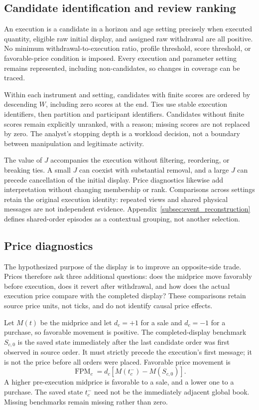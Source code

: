 \subsection{Candidate identification and review ranking}
\label{subsec:candidature_priority}
An execution is a candidate in a horizon and age setting precisely when executed quantity, eligible raw initial display, and assigned raw withdrawal are all positive. No minimum withdrawal-to-execution ratio, profile threshold, score threshold, or favorable-price condition is imposed. Every execution and parameter setting remains represented, including non-candidates, so changes in coverage can be traced.

Within each instrument and setting, candidates with finite scores are ordered by descending $W$, including zero scores at the end. Ties use stable execution identifiers, then partition and participant identifiers. Candidates without finite scores remain explicitly unranked, with a reason; missing scores are not replaced by zero. The analyst's stopping depth is a workload decision, not a boundary between manipulation and legitimate activity.

The value of $J$ accompanies the execution without filtering, reordering, or breaking ties. A small $J$ can coexist with substantial removal, and a large $J$ can precede cancellation of the initial display. Price diagnostics likewise add interpretation without changing membership or rank. Comparisons across settings retain the original execution identity: repeated views and shared physical messages are not independent evidence. Appendix~\ref{subsec:event_reconstruction} defines shared-order episodes as a contextual grouping, not another selection.

\subsection{Price diagnostics}
\label{sec:price_measures_simple}
\label{subsec:primary_price_selection}
\label{sec:joint_selection_simple}
The hypothesized purpose of the display is to improve an opposite-side trade. Prices therefore ask three additional questions: does the midprice move favorably before execution, does it revert after withdrawal, and how does the actual execution price compare with the completed display? These comparisons retain source price units, not ticks, and do not identify causal price effects.

Let $M(t)$ be the midprice and let $d_c=+1$ for a sale and $d_c=-1$ for a purchase, so favorable movement is positive. The completed-display benchmark $S_{c,0}$ is the saved state immediately after the last candidate order was first observed in source order. It must strictly precede the execution's first message; it is not the price before all orders were placed. Favorable price movement is
\begin{equation}
    \operatorname{FPM}_c=d_c\left[M(t_c^-)-M(S_{c,0})\right].
    \label{eq:favorable_price_move}
\end{equation}
A higher pre-execution midprice is favorable to a sale, and a lower one to a purchase. The saved state $t_c^-$ need not be the immediately adjacent global book. Missing benchmarks remain missing rather than zero.

